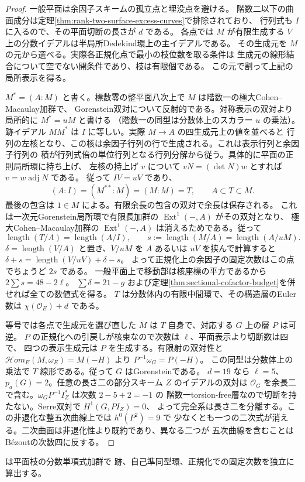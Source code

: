 \begin{proof}
一般平面は余因子スキームの孤立点と埋没点を避ける。
階数二以下の曲面成分は定理\ref{thm:rank-two-surface-excess-curves}で排除されており、
行列式も $I$ に入るので、その平面切断の長さが $d$ である。
各点では $M$ が有限生成する $V$ 上の分数イデアルは半局所Dedekind環上の主イデアルである。
その生成元を $M$ の元から選べる。実際各正規化点で最小の枝位数を取る条件は
生成元の線形結合について空でない開条件であり、枝は有限個である。
この元で割って上記の局所表示を得る。

$M^*=(A:M)$ と書く。標数零の整平面八次上で $M$ は階数一の極大Cohen--Macaulay加群で、
Gorenstein双対について反射的である。対称表示の双対より局所的に $M^*=uM$ と書ける
（階数一の同型は分数体上のスカラー $u$ の乗法）。
跡イデアル $MM^*$ は $I$ に等しい。実際 $M\to A$ の四生成元上の値を並べると
行列の左核となり、この核は余因子行列の行で生成される。これは表示行列と余因子行列の
積が行列式倍の単位行列となる行列分解から従う。具体的に平面の正則局所環に持ち上げ、
左核の持上げ $v$ について $vN=(\det N)w$ とすれば $v=w\operatorname{adj}N$ である。
従って $IV=uV$ であり、
\[
       (A:I)=(M^{**}:M)=(M:M)=T,\qquad A\subset T\subset M.
\]
最後の包含は $1\in M$ による。有限余長の包含の双対で余長は保存される。
これは一次元Gorenstein局所環で有限長加群の $\operatorname{Ext}^1(-,A)$ がその双対となり、
極大Cohen--Macaulay加群の $\operatorname{Ext}^1(-,A)$ は消えるためである。従って
\[
  \operatorname{length}(T/A)=\operatorname{length}(A/I),\qquad
  s:=\operatorname{length}(M/A)=\operatorname{length}(A/uM).
\]
$\delta=\operatorname{length}(V/A)$ と置き、$V/uM$ を $A$ あるいは $uV$ を挟んで計算すると
$\delta+s=\operatorname{length}(V/uV)+\delta-s$。
よって正規化上の余因子の固定次数はこの点でちょうど $2s$ である。
一般平面上で移動部は核座標の平方であるから $2\sum s=48-2\ell$。
$\sum\delta=21-g$ および定理\ref{thm:sectional-cofactor-budget}を併せれば全ての数値式を得る。
$T$ は分数体内の有限中間環で、その構造層のEuler数は $\chi(\mathcal O_E)+d$ である。

等号では各点で生成元を選び直した $M$ は $T$ 自身で、対応する $G$ 上の層 $P$ は可逆。
$P$ の正規化への引戻しが核束なので次数は $\ell$、平面表示より切断数は四で、
四つの表示生成元は $P$ を生成する。有限射の双対性と
$\mathcal Hom_E(M,\omega_E)=M(-H)$ より $P^{-1}\omega_G=P(-H)$。
この同型は分数体上の乗法で $T$ 線形である。従って $G$ はGorensteinである。
$d=19$ なら $\ell=5$、$p_a(G)=2$。任意の長さ二の部分スキーム $Z$ のイデアルの双対は
$\mathcal O_G$ を余長二で含む。$\omega_G P^{-1} I_Z^*$ は次数 $2-5+2=-1$ の
階数一torsion-free層なので切断を持たない。Serre双対で $H^1(G,P I_Z)=0$、
よって完全系は長さ二を分離する。この非退化な整五次曲線上では $h^0(P^2)=9$ で
少なくとも一つの二次式が消える。二次曲面は非退化性より既約であり、異なる二つが
五次曲線を含むことはBézoutの次数四に反する。
\end{proof}
 は平面枝の分数単項式加群で
跡、自己準同型環、正規化での固定次数を独立に算出する。
